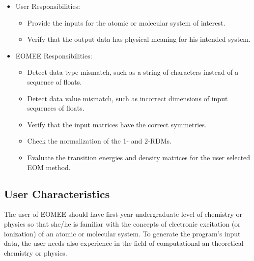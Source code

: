 \documentclass[12pt]{article}
\begin{document}

\begin{itemize}
	\item User Responsibilities:
	\begin{itemize}
		\item Provide the inputs for the atomic or molecular system of interest.
		\item Verify that the output data has physical meaning for his intended system.
	\end{itemize}
	\item EOMEE Responsibilities:
	\begin{itemize}
		\item Detect data type mismatch, such as a string of characters 
		instead of a sequence of floats.
		\item Detect data value mismatch, such as incorrect dimensions of input 
		sequences of floats.
		\item Verify that the input matrices have the correct symmetries.
		\item Check the normalization of the 1- and 2-RDMs.
		\item Evaluate the transition energies and density matrices for the 
		user selected EOM method.
	\end{itemize}
\end{itemize}

\subsection{User Characteristics} \label{SecUserCharacteristics}


The user of EOMEE should have first-year undergraduate level of chemistry 
or physics so that she/he is familiar with the concepts of electronic 
excitation (or ionization) of an atomic or molecular system. To generate the 
program's input data, the user needs also experience in the field of 
computational an theoretical chemistry or physics.
\end{document}
